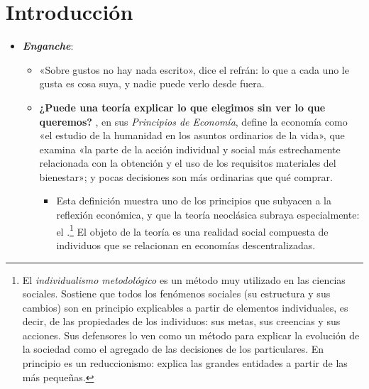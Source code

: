 \documentclass[11pt]{article}
\begin{document}
\tceetitulo

\section*{Introducción}

\begin{itemize}
\item \textbf{\emph{Enganche}}:
  \begin{itemize}
  \item «Sobre gustos no hay nada escrito», dice el refrán: lo que a cada uno le gusta es cosa suya, y nadie puede verlo desde fuera.
  \item \textbf{¿Puede una teoría explicar lo que elegimos sin ver lo que queremos?} \textcite[libro~I, cap.~I, §1]{Marshall1890Principles}, en sus \emph{Principios de Economía}, define la economía como «el estudio de la humanidad en los asuntos ordinarios de la vida», que examina «la parte de la acción individual y social más estrechamente relacionada con la obtención y el uso de los requisitos materiales del bienestar»; y pocas decisiones son más ordinarias que qué comprar.
    \begin{itemize}
    \item Esta definición muestra uno de los principios que subyacen a la reflexión económica, y que la teoría neoclásica subraya especialmente: el .\footnote{El \emph{individualismo metodológico} es un método muy utilizado en las ciencias sociales. Sostiene que todos los fenómenos sociales (su estructura y sus cambios) son en principio explicables a partir de elementos individuales, es decir, de las propiedades de los individuos: sus metas, sus creencias y sus acciones. Sus defensores lo ven como un método para explicar la evolución de la sociedad como el agregado de las decisiones de los particulares. En principio es un reduccionismo: explica las grandes entidades a partir de las más pequeñas.} El objeto de la teoría es una realidad social compuesta de individuos que se relacionan en economías descentralizadas.
    \end{itemize}

\end{itemize}
\end{itemize}
\end{document}
